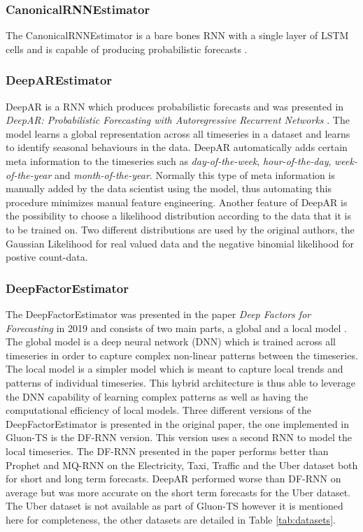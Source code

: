 \subsubsection{CanonicalRNNEstimator}
The CanonicalRNNEstimator is a bare bones RNN with a single layer of LSTM cells and is capable of producing probabilistic forecasts \cite{gluonts-github}.

\subsubsection{DeepAREstimator}
\label{algo:deepar}
DeepAR is a RNN which produces probabilistic forecasts and was presented in \textit{DeepAR: Probabilistic Forecasting with Autoregressive Recurrent Networks} \cite{salinas_deepar_2019}. The model learns a global representation across all timeseries in a dataset and learns to identify seasonal behaviours in the data. DeepAR automatically adds certain meta information to the timeseries such as \textit{day-of-the-week}, \textit{hour-of-the-day}, \textit{week-of-the-year} and \textit{month-of-the-year}. Normally this type of meta information is manually added by the data scientist using the model, thus automating this procedure minimizes manual feature engineering. Another feature of DeepAR is the possibility to choose a likelihood distribution according to the data that it is to be trained on. Two different distributions are used by the original authors, the Gaussian Likelihood for real valued data and the negative binomial likelihood for postive count-data.

\subsubsection{DeepFactorEstimator}
The DeepFactorEstimator was presented in the paper \textit{Deep Factors for Forecasting} in 2019 and consists of two main parts, a global and a local model \cite{wang_deep_2019}. The global model is a deep neural network (DNN) which is trained across all timeseries in order to capture complex non-linear patterns between the timeseries. The local model is a simpler model which is meant to capture local trends and patterns of individual timeseries. This hybrid architecture is thus able to leverage the DNN capability of learning complex patterns as well as having the computational efficiency of local models. Three different versions of the DeepFactorEstimator is presented in the original paper, the one implemented in Gluon-TS is the DF-RNN version. This version uses a second RNN to model the local timeseries. The DF-RNN presented in the paper performs better than Prophet and MQ-RNN on the Electricity, Taxi, Traffic and the Uber dataset both for short and long term forecasts. DeepAR performed worse than DF-RNN on average but was more accurate on the short term forecasts for the Uber dataset. The Uber dataset is not available as part of Gluon-TS however it is mentioned here for completeness, the other datasets are detailed in Table \ref{tab:datasets}.

